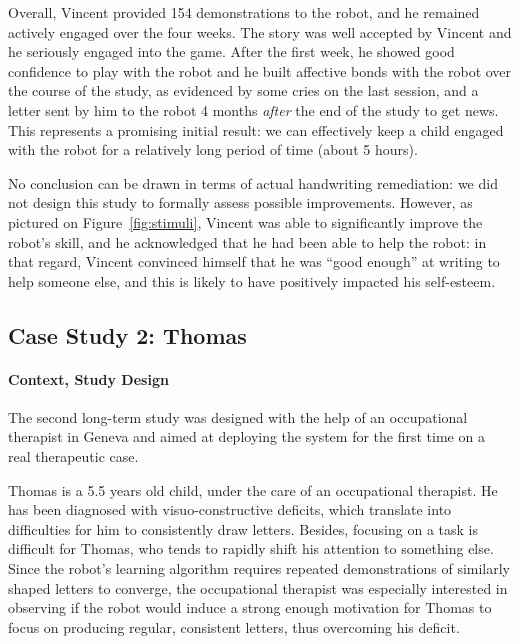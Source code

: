 \documentclass{article}
\begin{document}
Overall, Vincent provided 154 demonstrations to the robot, and he remained
actively engaged over the four weeks. The story was well accepted by Vincent and
he seriously engaged into the game. After the first week, he showed good
confidence to play with the robot and he built affective bonds with the robot
over the course of the study, as evidenced by some cries on the last session,
and a letter sent by him to the robot 4 months \emph{after} the end of the study
to get news. This represents a promising initial result: we can effectively keep
a child engaged with the robot for a relatively long period of time (about 5
hours).

No conclusion can be drawn in terms of actual handwriting remediation: we did
not design this study to formally assess possible improvements.  However, as
pictured on Figure~\ref{fig:stimuli}, Vincent was able to significantly improve
the robot's skill, and he acknowledged that he had been able to help the robot:
in that regard, Vincent convinced himself that he was ``good enough'' at writing
to help someone else, and this is likely to have positively impacted his
self-esteem.


\subsection{Case Study 2: Thomas}

\paragraph{Context, Study Design}

The second long-term study was designed with the help of an occupational therapist in
Geneva and aimed at deploying the system for the first time on a real
therapeutic case.

Thomas is a 5.5 years old child, under the care of an occupational therapist. He
has been diagnosed with visuo-constructive deficits, which translate into
difficulties for him to consistently draw letters. Besides, focusing on a task
is difficult for Thomas, who tends to rapidly shift his attention to something
else. Since the robot's learning algorithm requires repeated demonstrations of
similarly shaped letters to converge, the occupational therapist was especially
interested in observing if the robot would induce a strong enough motivation for
Thomas to focus on producing regular, consistent letters, thus overcoming his
deficit.
\end{document}
